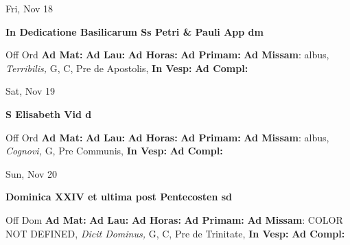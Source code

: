 \documentclass[10pt]{book}
\begin{document}
\begin{center}
\begin{minipage}{3.5in}
\vspace{2em}
\begin{center}Fri, Nov 18
\end{center}
\textbf{ \large In Dedicatione Basilicarum Ss Petri \& Pauli App
\textnormal{\normalsize dm}}

\begin{justify}Off Ord
\textbf{Ad Mat: }
\textbf{Ad Lau: }
\textbf{Ad Horas: }
\textbf{Ad Primam: }\textbf{Ad Missam}: albus, \textit{Terribilis,} G, C, Pre de Apostolis, 
\textbf{In Vesp: }
\textbf{Ad Compl: }
\end{justify}
\end{minipage}
\end{center}

\begin{center}
\begin{minipage}{3.5in}
\vspace{2em}
\begin{center}Sat, Nov 19
\end{center}
\textbf{ \large S Elisabeth Vid
\textnormal{\normalsize d}}

\begin{justify}Off Ord
\textbf{Ad Mat: }
\textbf{Ad Lau: }
\textbf{Ad Horas: }
\textbf{Ad Primam: }\textbf{Ad Missam}: albus, \textit{Cognovi,} G, Pre Communis, 
\textbf{In Vesp: }
\textbf{Ad Compl: }
\end{justify}
\end{minipage}
\end{center}

\begin{center}
\begin{minipage}{3.5in}
\vspace{2em}
\begin{center}Sun, Nov 20
\end{center}
\textbf{ \large Dominica XXIV et ultima post Pentecosten
\textnormal{\normalsize sd}}

\begin{justify}Off Dom
\textbf{Ad Mat: }
\textbf{Ad Lau: }
\textbf{Ad Horas: }
\textbf{Ad Primam: }\textbf{Ad Missam}: COLOR NOT DEFINED, \textit{Dicit Dominus,} G, C, Pre de Trinitate, 
\textbf{In Vesp: }
\textbf{Ad Compl: }
\end{justify}
\end{minipage}
\end{center}
\end{document}
